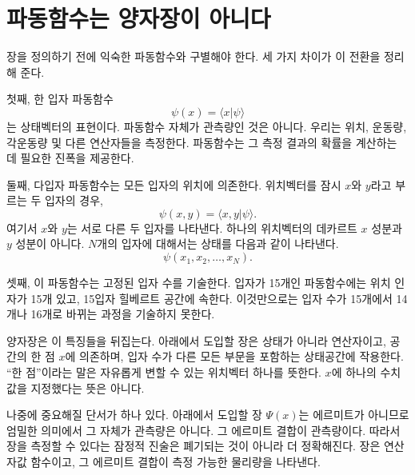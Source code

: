 \section{파동함수는 양자장이 아니다}

장을 정의하기 전에 익숙한 파동함수와 구별해야 한다. 세 가지 차이가 이 전환을 정리해 준다.

첫째, 한 입자 파동함수
\begin{equation}
\psi(x)=\langle x|\psi\rangle
\end{equation}
는 상태벡터의 표현이다. 파동함수 자체가 관측량인 것은 아니다. 우리는 위치, 운동량, 각운동량 및 다른 연산자들을 측정한다. 파동함수는 그 측정 결과의 확률을 계산하는 데 필요한 진폭을 제공한다.

둘째, 다입자 파동함수는 모든 입자의 위치에 의존한다. 위치벡터를 잠시 \(x\)와 \(y\)라고 부르는 두 입자의 경우,
\begin{equation}
\psi(x,y)=\langle x,y|\psi\rangle.
\end{equation}
여기서 \(x\)와 \(y\)는 서로 다른 두 입자를 나타낸다. 하나의 위치벡터의 데카르트 \(x\) 성분과 \(y\) 성분이 아니다. \(N\)개의 입자에 대해서는 상태를 다음과 같이 나타낸다.
\begin{equation}
\psi(x_1,x_2,\ldots,x_N).
\end{equation}

셋째, 이 파동함수는 고정된 입자 수를 기술한다. 입자가 15개인 파동함수에는 위치 인자가 15개 있고, 15입자 힐베르트 공간에 속한다. 이것만으로는 입자 수가 15개에서 14개나 16개로 바뀌는 과정을 기술하지 못한다.

양자장은 이 특징들을 뒤집는다. 아래에서 도입할 장은 상태가 아니라 연산자이고, 공간의 한 점 \(x\)에 의존하며, 입자 수가 다른 모든 부문을 포함하는 상태공간에 작용한다. ``한 점''이라는 말은 자유롭게 변할 수 있는 위치벡터 하나를 뜻한다. \(x\)에 하나의 수치값을 지정했다는 뜻은 아니다.

나중에 중요해질 단서가 하나 있다. 아래에서 도입할 장 \(\Psi(x)\)는 에르미트가 아니므로 엄밀한 의미에서 그 자체가 관측량은 아니다. 그 에르미트 결합이 관측량이다. 따라서 장을 측정할 수 있다는 잠정적 진술은 폐기되는 것이 아니라 더 정확해진다. 장은 연산자값 함수이고, 그 에르미트 결합이 측정 가능한 물리량을 나타낸다.

\begin{classroomqa}\end{classroomqa}

